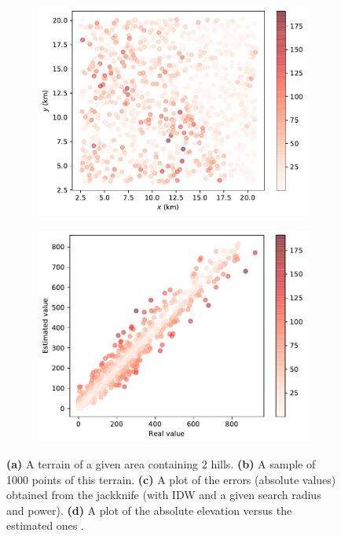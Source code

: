 \begin{figure}
\begin{subfigure}[b]{0.475\linewidth}
    \caption{}
  \end{subfigure}
  \begin{subfigure}[b]{0.45\linewidth}
    \centering
    \includegraphics[width=\textwidth]{figs/jackknife/jk3.pdf}
    \caption{}
  \end{subfigure}
  \quad
  \begin{subfigure}[b]{0.45\linewidth}
    \centering
    \includegraphics[width=\textwidth]{figs/jackknife/jk4.pdf}
    \caption{}
  \end{subfigure}
\caption{\textbf{(a)} A terrain of a given area containing 2 hills. \textbf{(b)} A sample of 1000 points of this terrain. \textbf{(c)} A plot of the errors (absolute values) obtained from the jackknife (with IDW and a given search radius and power). \textbf{(d)} A plot of the absolute elevation versus the estimated ones .}%
\end{figure}
